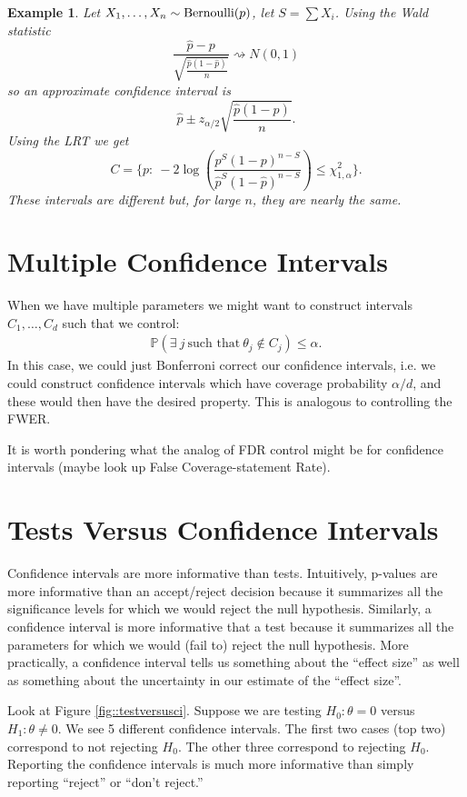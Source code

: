 \documentclass[twoside,12pt]{article}
\newtheorem{example}[theorem]{Example}
\begin{document}
\begin{example}
Let $X_1,\ldots, X_n \sim {\rm Bernoulli}(p)$, let $S = \sum X_i$.
Using the Wald statistic
$$
\frac{\widehat{p} -p}{\sqrt{ \frac{\widehat{p}(1-\widehat{p})}{n}}} \rightsquigarrow N(0,1)
$$
so an approximate confidence interval is
$$
\widehat p \pm z_{\alpha/2} \sqrt{ \frac{\widehat{p}(1-\widehat{p})}{n}}.
$$
Using the LRT we get
$$
C = \Biggl\{ p:\ 
-2 \log \left(\frac{ p^S (1-p)^{n-S}}{ \widehat{p}^S (1-\widehat{p})^{n-S}}\right) \leq \chi^2_{1,\alpha}\Biggr\}.
$$
These intervals are different but, for large $n$, they are nearly the same.
\end{example}

\section{Multiple Confidence Intervals}
When we have multiple parameters we might want to construct intervals $C_1,\ldots,C_d$ such that we control:
\begin{align*}
\mathbb{P}(\exists~j~\text{such that}~\theta_j \notin C_j) \leq \alpha.
\end{align*}
In this case, we could just Bonferroni correct our confidence intervals, i.e. we could construct confidence intervals which have coverage probability $\alpha/d$, and these would then have the desired property. This is analogous to controlling the FWER.

It is worth pondering what the analog of FDR control might be for confidence intervals (maybe look up False Coverage-statement Rate).

\section{Tests Versus Confidence Intervals}

Confidence intervals are more informative than tests. Intuitively, p-values are more informative than an accept/reject decision because it summarizes all the significance levels for which we would reject the null hypothesis. Similarly, a confidence interval is more informative that a test because it summarizes all the parameters for which we would (fail to) reject the null hypothesis. More practically, a confidence interval tells us something about the ``effect size'' as well as something about the uncertainty in our estimate of the ``effect size''. 

Look at Figure \ref{fig::testversusci}.
Suppose we are testing $H_0:\theta =0$ versus $H_1:\theta \neq 0$.
We see 5 different confidence intervals.
The first two cases (top two) correspond to not rejecting $H_0$.
The other three correspond to rejecting $H_0$.
Reporting the  confidence intervals is much more informative than
simply reporting ``reject'' or ``don't reject.''
\end{document}
